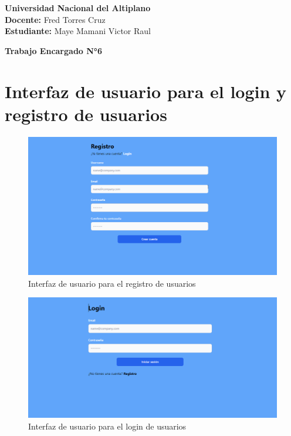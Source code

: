 \documentclass[12pt]{article}
\begin{document}
\noindent \textbf{Universidad Nacional del Altiplano\\
Docente: } Fred Torres Cruz\\
\textbf{Estudiante:} Maye Mamani Victor Raul

\vspace{2mm}
\noindent\textbf{Trabajo Encargado N°6}\\


\section{Interfaz de usuario para el login y registro de usuarios}

\begin{figure}[H]
    \centering
    \includegraphics[width=1\textwidth]{./img/UI-Register.png}
    \caption{Interfaz de usuario para el registro de usuarios}
    \label{fig:my_label}
\end{figure}

\begin{figure}[H]
    \centering
    \includegraphics[width=1\textwidth]{./img/UI-Login.png}
    \caption{Interfaz de usuario para el login de usuarios}
    \label{fig:my_label}
\end{figure}
\end{document}
